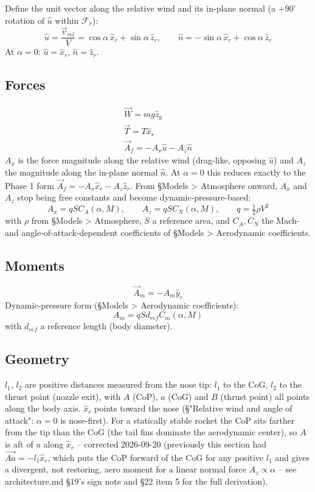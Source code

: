 \documentclass[10pt]{extarticle}
\numberwithin{equation}{subsubsection}
\begin{document}
Define the unit vector along the relative wind and its in-plane normal (a $+90^\circ$ rotation of
$\hat{u}$ within $\mathcal{F}_r$):
\begin{equation}
    \hat{u} = \frac{\vec{v}_{rel}}{V} = \cos\alpha\,\hat{x}_r + \sin\alpha\,\hat{z}_r, \qquad
    \hat{n} = -\sin\alpha\,\hat{x}_r + \cos\alpha\,\hat{z}_r
\end{equation}
At $\alpha = 0$: $\hat{u} = \hat{x}_r$, $\hat{n} = \hat{z}_r$.

\subsection{Forces}
\begin{gather}
    \vec{W} = mg\hat{z}_g \\
    \vec{T} = T\hat{x}_r \\
    \vec{A}_f = -A_x\hat{u} - A_z\hat{n}
\end{gather}
$A_x$ is the force magnitude along the relative wind (drag-like, opposing $\hat{u}$) and $A_z$ the
magnitude along the in-plane normal $\hat{n}$. At $\alpha = 0$ this reduces exactly to the Phase 1
form $\vec{A}_f = -A_x\hat{x}_r - A_z\hat{z}_r$. From \S Models > Atmosphere onward, $A_x$ and
$A_z$ stop being free constants and become dynamic-pressure-based:
\begin{equation}
    A_x = qSC_A(\alpha, M), \qquad A_z = qSC_N(\alpha, M), \qquad q = \tfrac{1}{2}\rho V^2
\end{equation}
with $\rho$ from \S Models > Atmosphere, $S$ a reference area, and $C_A, C_N$ the Mach- and
angle-of-attack-dependent coefficients of \S Models > Aerodynamic coefficients.
\subsection{Moments}
\begin{equation}
    \vec{A}_m = -A_m\hat{y}_r
\end{equation}
Dynamic-pressure form (\S Models > Aerodynamic coefficients):
\begin{equation}
    A_m = qSd_{ref}C_m(\alpha, M)
\end{equation}
with $d_{ref}$ a reference length (body diameter).
\subsection{Geometry}
$l_1$, $l_2$ are positive distances measured from the nose tip: $l_1$ to the CoG, $l_2$ to the
thrust point (nozzle exit), with $A$ (CoP), $a$ (CoG) and $B$ (thrust point) all points along the
body axis. $\hat{x}_r$ points toward the nose (\S "Relative wind and angle of attack": $\alpha=0$
is nose-first). For a statically stable rocket the CoP sits farther from the tip than the CoG (the
tail fins dominate the aerodynamic center), so $A$ is aft of $a$ along $\hat{x}_r$ -- corrected
2026-09-20 (previously this section had $\vec{Aa}=-l_1\hat{x}_r$, which puts the CoP forward of
the CoG for any positive $l_1$ and gives a divergent, not restoring, aero moment for a linear
normal force $A_z \propto \alpha$ -- see architecture.md \S19's sign note and \S22 item 5 for the
full derivation).
\end{document}
